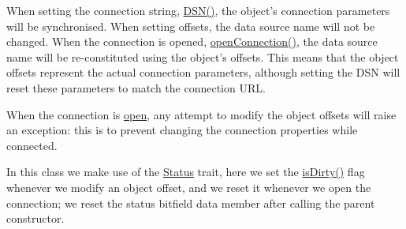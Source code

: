 When setting the connection string, \hyperlink{class_ontology_wrapper_1_1_connection_object_a9a013bdb9589e847926d196de62e87e3}{D\-S\-N()}, the object's connection parameters will be synchronised. When setting offsets, the data source name will not be changed. When the connection is opened, \hyperlink{class_ontology_wrapper_1_1_connection_object_aa65904a3e38f1b04cdea1d88dd80793b}{open\-Connection()}, the data source name will be re-\/constituted using the object's offsets. This means that the object offsets represent the actual connection parameters, although setting the D\-S\-N will reset these parameters to match the connection U\-R\-L.

When the connection is \hyperlink{class_ontology_wrapper_1_1_connection_object_abfd8e3b96ce288b2d1b1e586e8e7172a}{open}, any attempt to modify the object offsets will raise an exception\-: this is to prevent changing the connection properties while connected.

In this class we make use of the \hyperlink{}{Status} trait, here we set the \hyperlink{}{is\-Dirty()} flag whenever we modify an object offset, and we reset it whenever we open the connection; we reset the status bitfield data member after calling the parent constructor.

